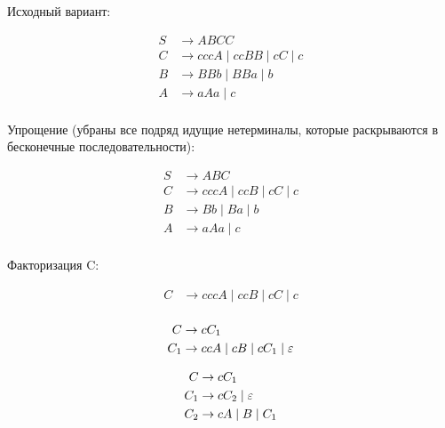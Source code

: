 


\tableofcontents


\newpage
\Chapter{\lab\ \labnumber}{\labtheme}{}

 Исходный вариант:

\begin{align*}
S & \to ABCC\\
C & \to cccA  \;|\;  ccBB   \;|\;  cC  \;|\;  c\\
B & \to BBb  \;|\;  BBa  \;|\;  b\\
A & \to aAa  \;|\;  c \\
\end{align*}

Упрощение (убраны все подряд идущие нетерминалы, которые раскрываются в
бесконечные последовательности):

\begin{align*}
S & \to ABC\\
C & \to cccA  \;|\;  ccB   \;|\;  cC  \;|\;  c\\
B & \to Bb  \;|\;  Ba  \;|\;  b\\
A & \to aAa  \;|\;  c \\
\end{align*}

Факторизация C:

\begin{align*}
C & \to c c c A  \;|\;  c c B  \;|\;  c C  \;|\;  c\\
\end{align*}

\begin{align*}
C & \to c C_1\\
C_1 & \to c c A  \;|\;  c B  \;|\;  c C_1  \;|\;  \varepsilon\\
\end{align*}

\begin{align*}
C & \to c C_1\\
C_1 & \to c C_2  \;|\;  \varepsilon\\
C_2 & \to c A  \;|\;  B  \;|\;  C_1\\
\end{align*}

